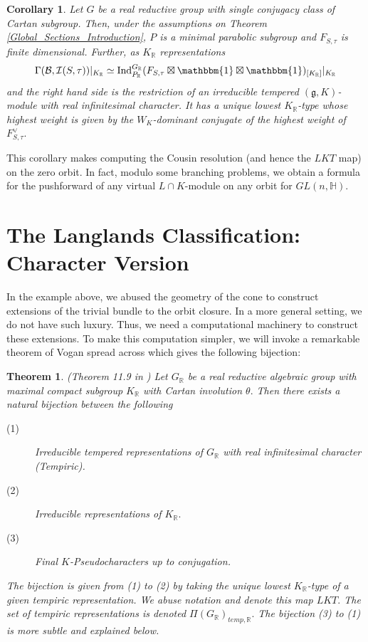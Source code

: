\documentclass[letterpaper,twosided,11pt]{article}
\theoremstyle{plain}
\newtheorem*{ntheorem}{Theorem}
\newtheorem{corollary}[theorem]{Corollary}
\theoremstyle{definition}
\theoremstyle{remark}
\newcommand{\HH}{\mathbb{H}}
\newcommand{\R}{\mathbb{R}}
\newcommand{\Ind}{\operatorname{Ind}}
\newcommand{\lie}[1]{\mathfrak{#1}}
\begin{document}
\begin{corollary} 
	Let $G$ be a real reductive group with single conjugacy class of Cartan subgroup. Then, under the assumptions on Theorem \ref{Global_Sections_Introduction}, $P$ is a minimal parabolic subgroup and $F_{S,\tau}$ is finite dimensional. Further, as $K_\R$ representations \[ \Gamma(\mathcal{B}, \mathcal{I}(S,\tau))|_{K_\R}\simeq \Ind_{P_\R}^{G_\R}(F_{S,\tau}\boxtimes \mathbbm{1} \boxtimes \mathbbm{1})_{[K_\R]}|_{K_\R}\]
	and the right hand side is the restriction of an irreducible tempered $(\lie{g},K)$-module with real infinitesimal character. It has a unique lowest $K_\R$-type whose highest weight is given by the $W_K$-dominant conjugate of the highest weight of $ F_{S,\tau}^\vee.$ 
\end{corollary} 

This corollary makes computing the Cousin resolution (and hence the $LKT$ map) on the zero orbit. In fact, modulo some branching problems, we obtain a formula for the pushforward of any virtual $L\cap K$-module on any orbit for $GL(n,\HH).$ 








\section{The Langlands Classification: Character Version}

In the example above, we abused the geometry of the cone to construct extensions of the trivial bundle to the orbit closure. In a more general setting, we do not have such luxury. Thus, we need a computational machinery to construct these extensions. To make this computation simpler, we will invoke a remarkable theorem of Vogan spread across \cite{Vogan1981} which gives the following bijection: 
	
	\begin{ntheorem}\label{Tempiric_LKT_Bijection}\cite{Vogan1981} (Theorem 11.9 in \cite{Vogan2007}) 
		Let $G_\R$ be a real reductive algebraic group with maximal compact subgroup $K_\R$ with Cartan involution $\theta.$ Then there exists a natural bijection between the following 
		\begin{description} 
			\item[(1)] Irreducible tempered representations of $G_\R$ with real infinitesimal character (Tempiric). 
			\item[(2)] Irreducible representations of $K_\R.$   
			\item[(3)] Final $K$-Pseudocharacters up to conjugation.  
		\end{description} 	 
		The bijection is given from (1) to (2) by taking the unique lowest $K_\R$-type of a given tempiric representation. We abuse notation and denote this map $LKT.$ The set of tempiric representations is denoted $\Pi(G_\R)_{temp,\R}.$ The bijection (3) to (1) is more subtle and explained below.    
	\end{ntheorem}     
	
\end{document}
